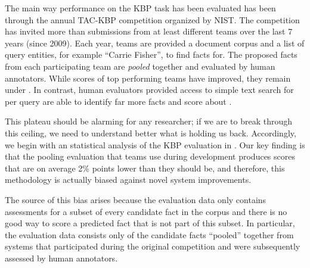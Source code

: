 
The main way performance on the KBP task has been evaluated has been through the annual TAC-KBP competition organized by NIST.\@
The competition has invited more than  submissions from at least  different teams over the last 7 years (since 2009).
Each year, teams are provided a document corpus and a list of query entities, for example ``Carrie Fisher'', to find facts for.
The proposed facts from each participating team are \emph{pooled} together and evaluated by human annotators.
While scores of top performing teams have improved, they remain under .
In contrast, human evaluators provided access to simple text search for  per query are able to identify far more facts and score about .

This plateau should be alarming for any researcher; if we are to break through this ceiling, we need to understand better what is holding us back.
Accordingly, we begin with an statistical analysis of the KBP evaluation in .
Our key finding is that the pooling evaluation that teams use during development
produces scores that are on average 2\% points lower than they should be,
and therefore, this methodology is actually biased against novel system improvements.

The source of this bias arises because
the evaluation data only contains assessments for a subset of every candidate fact in the corpus
and there is no good way to score a predicted fact that is not part of this subset.
In particular, the evaluation data consists only of the candidate facts
``pooled'' together from systems that participated during the original
competition and were subsequently assessed by human annotators.

